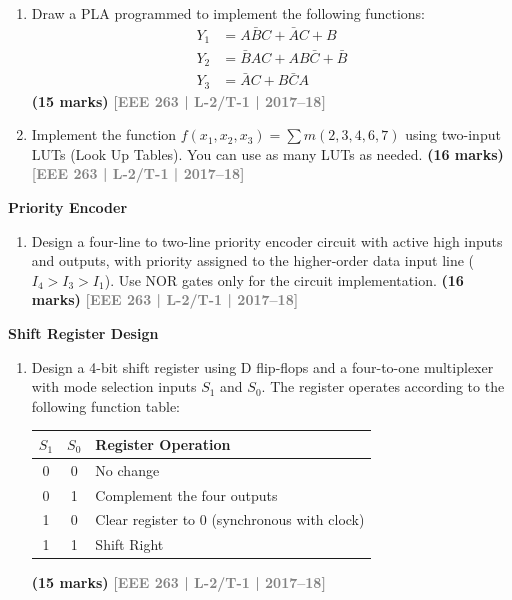\documentclass[12pt,a4paper]{article}
\newcommand{\yr}[1]{\hfill\textcolor{gray}{\small\textbf{[#1]}}}
\newcommand{\mk}[1]{\textcolor{orange!70!black}{\small\textbf{(#1 marks)}}}
\newcommand{\subtopic}[2]{%
  \vspace{10pt}
  \noindent\begin{tcolorbox}[colback=#1!8,colframe=#1,boxrule=0.6pt,arc=4pt,
    left=6pt,right=6pt,top=4pt,bottom=4pt]
    \small\bfseries\textcolor{#1}{#2}
  \end{tcolorbox}
  \vspace{2pt}
}
\begin{document}
\begin{enumerate}
\mk{11} \yr{EEE 263 | L-2/T-1 | 2016--17}

\item Draw a PLA programmed to implement the following functions:
\begin{align*}
Y_1 &= A\bar{B}C + \bar{A}C + B \\
Y_2 &= \bar{B}AC + AB\bar{C} + \bar{B} \\
Y_3 &= \bar{A}C + B\bar{C}A
\end{align*}
\mk{15} \yr{EEE 263 | L-2/T-1 | 2017--18}

\item Implement the function $f(x_1,x_2,x_3)=\sum m(2,3,4,6,7)$ using two-input LUTs (Look Up Tables). You can use as many LUTs as needed.
\mk{16} \yr{EEE 263 | L-2/T-1 | 2017--18}

\end{enumerate}

\subtopic{cD}{Priority Encoder}
\label{sub:s9-encoder}

\begin{enumerate}

\item Design a four-line to two-line priority encoder circuit with active high inputs and outputs, with priority assigned to the higher-order data input line ($I_4 > I_3 > I_1$). Use NOR gates only for the circuit implementation.
\mk{16} \yr{EEE 263 | L-2/T-1 | 2017--18}

\end{enumerate}

\subtopic{cD}{Shift Register Design}
\label{sub:s9-shift}

\begin{enumerate}

\item Design a 4-bit shift register using D flip-flops and a four-to-one multiplexer with mode selection inputs $S_1$ and $S_0$. The register operates according to the following function table:
\begin{center}
\begin{tabular}{ccl}
\toprule
$S_1$ & $S_0$ & \textbf{Register Operation} \\
\midrule
0 & 0 & No change \\
0 & 1 & Complement the four outputs \\
1 & 0 & Clear register to 0 (synchronous with clock) \\
1 & 1 & Shift Right \\
\bottomrule
\end{tabular}
\end{center}
\mk{15} \yr{EEE 263 | L-2/T-1 | 2017--18}

\end{enumerate}
\end{document}
